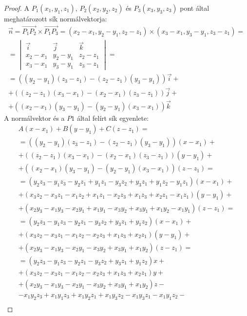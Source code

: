\begin{proof}
A $P_1(x_1, y_1, z_1)$, $P_2(x_2, y_2, z_2)$ és $P_3(x_3, y_3, z_3)$ pont által meghatározott sík normálvektorja:
\[
\begin{array}{c}
	\vec{n}=\overrightarrow{P_1 P_2}\times\overrightarrow{P_1 P_3}=(x_2-x_1, y_2-y_1, z_2-z_1)\times(x_3-x_1, y_3-y_1, z_3-z_1)=\\
	=
	\begin{vmatrix}
		\vec{i} & \vec{j} & \vec{k} \\
		x_2-x_1 & y_2-y_1 & z_2-z_1 \\
		x_3-x_1 & y_3-y_1 & z_3-z_1
	\end{vmatrix}=\\
	= ((y_2-y_1)(z_3-z_1)-(z_2-z_1)(y_3-y_1))\vec{i}+\\
	+ ((z_2-z_1)(x_3-x_1)-(x_2-x_1)(z_3-z_1))\vec{j}+\\
	+ ((x_2-x_1)(y_3-y_1)-(y_2-y_1)(x_3-x_1))\vec{k}
\end{array}
\]
A normálvektor és a $P1$ által felírt sík egyenlete:
\[
\begin{array}{c}
	A(x-x_1)+B(y-y_1)+C(z-z_1)=\\
	=((y_2-y_1)(z_3-z_1)-(z_2-z_1)(y_3-y_1))(x-x_1)+\\
	+((z_2-z_1)(x_3-x_1)-(x_2-x_1)(z_3-z_1))(y-y_1)+\\
	+((x_2-x_1)(y_3-y_1)-(y_2-y_1)(x_3-x_1))(z-z_1)=\\
	=(y_2 z_3 - y_1 z_3 - y_2 z_1 + y_1 z_1 - y_3 z_2 + y_3 z_1 + y_1 z_2 - y_1 z_1)(x-x_1)+\\
	+(x_3 z_2 - x_3 z_1 - x_1 z_2 + x_1 z_1 - x_2 z_3 + x_1 z_3 + x_2 z_1 - x_1 z_1)(y-y_1)+\\
	+(x_2 y_3 - x_1 y_3 - x_2 y_1 + x_1 y_1 - x_3 y_2 + x_3 y_1 + x_1 y_2 - x_1 y_1)(z-z_1)=\\
	=(y_2 z_3 - y_1 z_3 - y_2 z_1 - y_3 z_2 + y_3 z_1 + y_1 z_2)(x-x_1)+\\
	+(x_3 z_2 - x_3 z_1 - x_1 z_2 - x_2 z_3 + x_1 z_3 + x_2 z_1)(y-y_1)+\\
	+(x_2 y_3 - x_1 y_3 - x_2 y_1 - x_3 y_2 + x_3 y_1 + x_1 y_2)(z-z_1)=\\
	=(y_2 z_3 - y_1 z_3 - y_2 z_1 - y_3 z_2 + y_3 z_1 + y_1 z_2)x+\\
	+(x_3 z_2 - x_3 z_1 - x_1 z_2 - x_2 z_3 + x_1 z_3 + x_2 z_1)y+\\
	+(x_2 y_3 - x_1 y_3 - x_2 y_1 - x_3 y_2 + x_3 y_1 + x_1 y_2)z-\\
	- x_1 y_2 z_3 + x_1 y_1 z_3 + x_1 y_2 z_1 + x_1 y_3 z_2 - x_1 y_3 z_1 - x_1 y_1 z_2 -\\

\end{array}\]
\end{proof}
